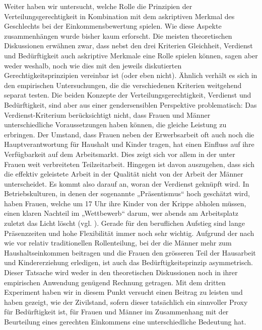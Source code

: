 \documentclass[a4paper,12pt]{article}
\begin{document}
Weiter haben wir untersucht, welche Rolle die Prinzipien der
Verteilungsgerechtigkeit in Kombination mit dem askriptiven Merkmal des
Geschlechts bei der Einkommensbewertung spielen. Wie diese Aspekte
zusammenhängen wurde bisher kaum erforscht. Die meisten theoretischen
Diskussionen erwähnen zwar, dass nebst den drei Kriterien Gleichheit, Verdienst
und Bedürftigkeit auch askriptive Merkmale eine Rolle spielen können, sagen
aber weder weshalb, noch wie dies mit den jeweils diskutierten
Gerechtigkeitsprinzipien vereinbar ist (oder eben nicht). Ähnlich verhält es
sich in den empirischen Untersuchungen, die die verschiedenen Kriterien
weitgehend separat testen. Die beiden Konzepte der Verteilungsgerechtigkeit,
Verdienst und Bedürftigkeit, sind aber aus einer gendersensiblen Perspektive
problematisch: Das Verdienst-Kriterium berücksichtigt nicht, dass Frauen und
Männer unterschiedliche Voraussetzungen haben können, die gleiche Leistung zu
erbringen. Der Umstand, dass Frauen neben der Erwerbsarbeit oft auch noch die
Hauptverantwortung für Haushalt und Kinder tragen, hat einen Einfluss auf ihre
Verfügbarkeit auf dem Arbeitsmarkt. Dies zeigt sich vor allem in der unter
Frauen weit verbreiteten Teilzeitarbeit. Hingegen ist davon auszugehen, dass
sich die effektiv geleistete Arbeit in der Qualität nicht von der Arbeit der
Männer unterscheidet. Es kommt also darauf an, woran der Verdienst geknüpft
wird. In Betriebskulturen, in denen der sogenannte „Präsentismus“ hoch
geschätzt wird, haben Frauen, welche um 17 Uhr ihre Kinder von der Krippe
abholen müssen, einen klaren Nachteil im „Wettbewerb“ darum, wer abends am
Arbeitsplatz zuletzt das Licht löscht (vgl. \citealp{Goldin-2014}). Gerade für
den beruflichen Aufstieg sind lange Präsenzzeiten und hohe Flexibilität immer
noch sehr wichtig. Aufgrund der nach wie vor relativ traditionellen
Rollenteilung, bei der die Männer mehr zum Haushaltseinkommen beitragen und die
Frauen den grösseren Teil der Hausarbeit und Kindererziehung erledigen, ist
auch das Bedürftigkeitsprinzip asymmetrisch. Dieser Tatsache wird weder in den
theoretischen Diskussionen noch in ihrer empirischen Anwendung genügend
Rechnung getragen. Mit dem dritten Experiment haben wir in diesem Punkt
versucht einen Beitrag zu leisten und haben gezeigt, wie der Zivilstand, sofern
dieser tatsächlich ein sinnvoller Proxy für Bedürftigkeit ist, für Frauen und
Männer im Zusammenhang mit der Beurteilung eines gerechten Einkommens eine
unterschiedliche Bedeutung hat.



\begin{small}


\end{small}
\end{document}
